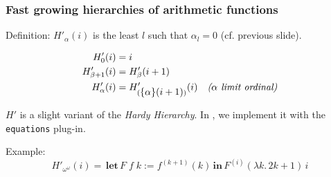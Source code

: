 \documentclass[10pt, fleqn]{beamer}
\begin{document}
\begin{frame}
  \frametitle{Fast growing hierarchies of arithmetic functions}




\begin{block}{Definition:}
  \textcolor{mathcolor}{$H'_\alpha(i)$} is the least $l$ such that \textcolor{mathcolor}{$\alpha_l=0$} (cf. previous slide). 

 
 {\color{mathcolor}
\begin{align}
  H'_0(i) & = i\\
  H'_{\beta+1}(i) &=H'_\beta(i+1) \\
  H'_\alpha(i) &= H'_{(\mbox{$\{\alpha\}(i+1)$})}(i)  \quad\textit{($\alpha$ limit ordinal)} 
\end{align}}


$H'$ is a slight variant of the \emph{Hardy Hierarchy}. In \coq, we implement it with the \texttt{equations} plug-in.
\end{block}
 
\begin{block}{Example:}
  {\color{mathcolor}
  $$      H'_{\omega^\omega}(i)=\, \textbf{let}\,F\;f\;k := f^{(k+1)}(k)\,
                                  \textbf{in}\, F^{(i)}(\lambda k.\,2k+1)\,i$$
}
\end{block}
 

 





\end{frame}



 
\end{document}
